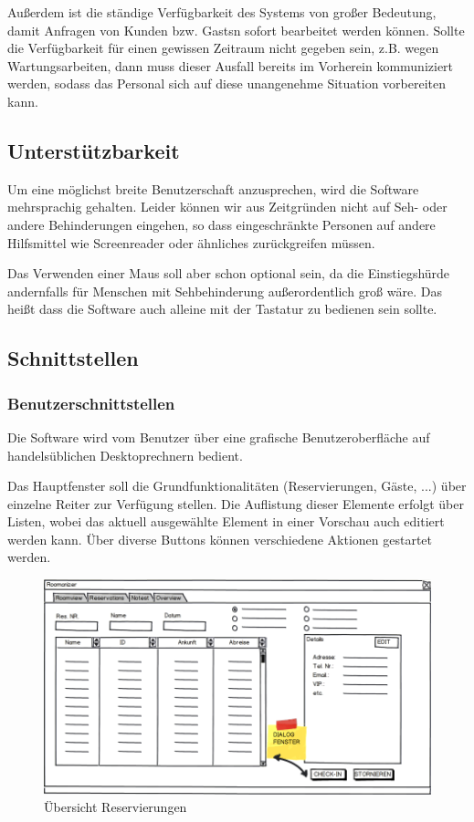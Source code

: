 \documentclass[10pt,a4paper,titlepage]{article}
\begin{document}
Außerdem ist die ständige Verfügbarkeit des Systems von großer Bedeutung, damit Anfragen von \Gls{Kunde}n bzw. \Glspl{Gast}n sofort bearbeitet werden können. Sollte die Verfügbarkeit für einen gewissen Zeitraum nicht gegeben sein, z.B. wegen Wartungsarbeiten, dann muss dieser Ausfall bereits im Vorherein kommuniziert werden, sodass das Personal sich auf diese unangenehme Situation vorbereiten kann.
\subsection{Unterstützbarkeit}
Um eine möglichst breite Benutzerschaft anzusprechen, wird die Software mehrsprachig gehalten. Leider können wir aus Zeitgründen nicht auf Seh- oder andere Behinderungen eingehen, so dass eingeschränkte Personen auf andere Hilfsmittel wie Screenreader oder ähnliches zurückgreifen müssen.

Das Verwenden einer Maus soll aber schon optional sein, da die Einstiegshürde andernfalls für Menschen mit Sehbehinderung außerordentlich groß wäre. Das heißt dass die Software auch alleine mit der Tastatur zu bedienen sein sollte.
\subsection{Schnittstellen}
\subsubsection{Benutzerschnittstellen}
Die Software wird vom Benutzer über eine grafische Benutzeroberfläche auf handelsüblichen Desktoprechnern bedient.

Das Hauptfenster soll die Grundfunktionalitäten (Reservierungen, Gäste, ...) über einzelne Reiter zur Verfügung stellen. Die Auflistung dieser Elemente erfolgt über Listen, wobei das aktuell ausgewählte Element in einer Vorschau auch editiert werden kann. Über diverse Buttons können verschiedene Aktionen gestartet werden.
\begin{figure}[h]
	\includegraphics[width=\linewidth]{Images/GUI_Overview.png}
	\caption{Übersicht Reservierungen}
\end{figure}
\end{document}
